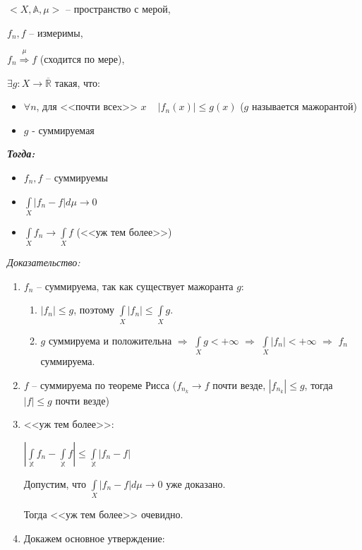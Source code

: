 \documentclass[paper=a4, fontsize=17pt]{article}
\begin{document}
\begin{flushleft}

$<X, \mathds{A}, \mu>$ -- пространство с мерой,

$f_n, f$ -- измеримы,

$f_n\stackrel{\mu}{\Rightarrow}f$ (сходится по мере),

$\exists g : X \rightarrow \overline{\mathds{R}}$ такая, что:
\begin{itemize}
\item
$\forall n$,  для <<почти всеx>> $x$ ~ $|f_n(x)| \leq g(x)$ ($g$ называется мажорантой)
\item
$g$ - суммируемая
\end{itemize}

\emph{\textbf{Тогда:}}
\begin{itemize}
    \item $f_n, f$ -- суммируемы
    \item $\int\limits_{X} |f_n - f| d\mu \rightarrow 0$
    \item $\int\limits_{X} f_n \rightarrow \int\limits_{X} f$ (<<уж тем более>>)
\end{itemize}

\emph{Доказательство:}

\begin{enumerate}
	\item $f_n$ -- суммируема, так как существует мажоранта $g$:\\
    \begin{enumerate}
        \item $|f_n| \leq g$, поэтому $\int\limits_X|f_n| \leq \int\limits_X g$.
        \item $g$ суммируема и положительна $\Rightarrow$ $\int\limits_X g < +\infty$ $\Rightarrow$ $\int\limits_X|f_n| < +\infty$
        $\Rightarrow$ $f_n$ суммируема.
    \end{enumerate}
	\item $f$ -- суммируема по теореме Рисса ($f_{n_k} \rightarrow f $ почти везде, $ |f_{n_k}| \leq g$, тогда $|f| \leq g$ почти везде)
	\item <<уж тем более>>:

	$ |\int\limits_{\mathbb{X}} f_n - \int\limits_{\mathbb{X}} f| \leq \int\limits_{\mathbb{X}} |f_n - f| $

	Допустим, что $\int\limits_{X} |f_n - f| d\mu \rightarrow 0$ уже доказано.

	Тогда <<уж тем более>> очевидно.

	\item Докажем основное утверждение:


\end{enumerate}
\end{flushleft}
\end{document}

